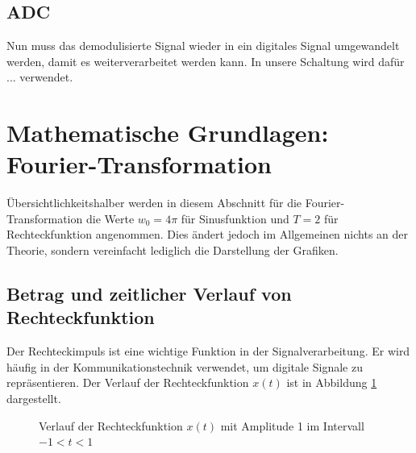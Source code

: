 \subsection{ADC}
Nun muss das demodulisierte Signal wieder in ein digitales Signal umgewandelt werden, damit es weiterverarbeitet werden kann.
In unsere Schaltung wird dafür ... verwendet. 


\section{Mathematische Grundlagen: Fourier-Transformation}
Übersichtlichkeitshalber werden in diesem Abschnitt für die Fourier-Transformation die Werte $w_0 = 4\pi$ für Sinusfunktion und $T = 2$ für Rechteckfunktion angenommen. Dies ändert jedoch im Allgemeinen nichts an der Theorie, sondern vereinfacht lediglich die Darstellung der Grafiken.
\subsection{Betrag und zeitlicher Verlauf von Rechteckfunktion}
Der Rechteckimpuls ist eine wichtige Funktion in der Signalverarbeitung.
Er wird häufig in der Kommunikationstechnik verwendet, um digitale Signale zu repräsentieren.
Der Verlauf der Rechteckfunktion $x(t)$ ist in Abbildung \ref{fig:rechteck} dargestellt.
\begin{figure}[H]
    \centering
    \caption{Verlauf der Rechteckfunktion $x(t)$ mit Amplitude 1 im Intervall $-1 < t < 1$}
    \label{fig:rechteck}
\end{figure}

